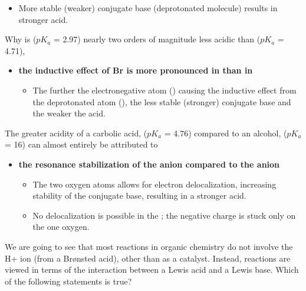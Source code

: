 \documentclass[12pt,a4paper]{article}
\begin{document}
\begin{enumerate}
\begin{itemize}
\begin{itemize}
                    \item More stable (weaker) conjugate base (deprotonated molecule) results in stronger acid. 
                \end{itemize}
        \end{itemize}
    {\color{G-Moon}\item Why is  (\(pK_a\) = 2.97) nearly two orders of magnitude less acidic than  (\(pK_a\) = 4.71),  }
        \begin{itemize}
            \item {\color{o-Sun}\textbf{the inductive effect of Br is more pronounced in  than in }}
                \begin{itemize}
                    \item The further the electronegative atom () causing the inductive effect from the deprotonated atom (), the less stable (stronger) conjugate base and the weaker the acid. 
                \end{itemize}
        \end{itemize}
    {\color{G-Moon}\item The greater acidity of a carbolic acid,  (\(pK_a\) = 4.76) compared to an alcohol,  (\(pK_a\) = 16) can almost entirely be attributed to}
        \begin{itemize}
            \item {\color{o-Sun}\textbf{the resonance stabilization of the  anion compared to the  anion}}
                \begin{itemize}
                    \item The two oxygen atoms allows for electron delocalization, increasing stability of the conjugate base, resulting in a stronger acid.
                    \item No delocalization is possible in the ; the negative charge is stuck only on the one oxygen.
                \end{itemize}
        \end{itemize}
    {\color{G-Moon}\item We are going to see that most reactions in organic chemistry do not involve the H+ ion (from a Br{\o}nsted acid), other than as a catalyst.  Instead, reactions are viewed in terms of the interaction between a Lewis acid and a Lewis base.  Which of the following statements is true?}
        \begin{itemize}

\end{itemize}
\end{enumerate}
\end{document}
